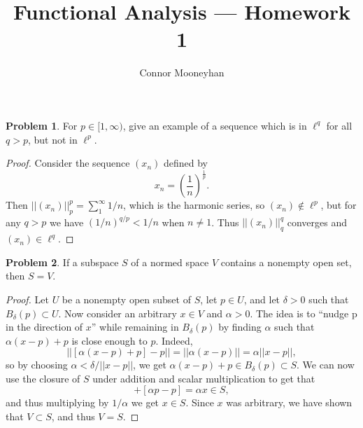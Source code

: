 \documentclass[12pt]{article}
\title{Functional Analysis --- Homework 1}
\author{Connor Mooneyhan}
\date{}
\theoremstyle{definition}
\newtheorem{ex}{Problem}
\begin{document}
\maketitle

\begin{ex}
	For $p \in [1, \infty)$, give an example of a sequence which is in $\ell^q$ for all $q > p$, but not in $\ell^p$.
\end{ex}
\begin{proof}
	Consider the sequence $(x_n)$ defined by \begin{equation*}
		x_n = \left( \frac{1}{n} \right)^{\frac{1}{p}}.
	\end{equation*}
	Then $||(x_n)||_p^p = \sum_1^\infty 1/n$, which is the harmonic series, so $(x_n) \notin \ell^p$, but for any $q > p$ we have $(1/n)^{q/p} < 1/n$ when $n \neq 1$.
	Thus $||(x_n)||_q^q$ converges and $(x_n) \in \ell^q$.
\end{proof}

\begin{ex}
	If a subspace $S$ of a normed space $V$ contains a nonempty open set, then $S = V$.
\end{ex}
\begin{proof}
	Let $U$ be a nonempty open subset of $S$, let $p \in U$, and let $\delta > 0$ such that $B_\delta(p) \subset U$.
	Now consider an arbitrary $x \in V$ and $\alpha > 0$.
	The idea is to ``nudge p in the direction of $x$'' while remaining in $B_\delta(p)$ by finding $\alpha$ such that $\alpha(x-p) + p$ is close enough to $p$.
	Indeed, \begin{equation*}
		||[\alpha(x-p) + p] - p|| = ||\alpha(x-p)|| = \alpha||x-p||,
	\end{equation*}
	so by choosing $\alpha < \delta/||x-p||$, we get $\alpha(x-p) + p \in B_\delta(p) \subset S$.
	We can now use the closure of $S$ under addition and scalar multiplication to get that \begin{equation*}
		[\alpha(x-p) + p] + [\alpha p - p] = \alpha x \in S,
	\end{equation*}
	and thus multiplying by $1/\alpha$ we get $x \in S$.
	Since $x$ was arbitrary, we have shown that $V \subset S$, and thus $V = S$.
\end{proof}
\end{document}
